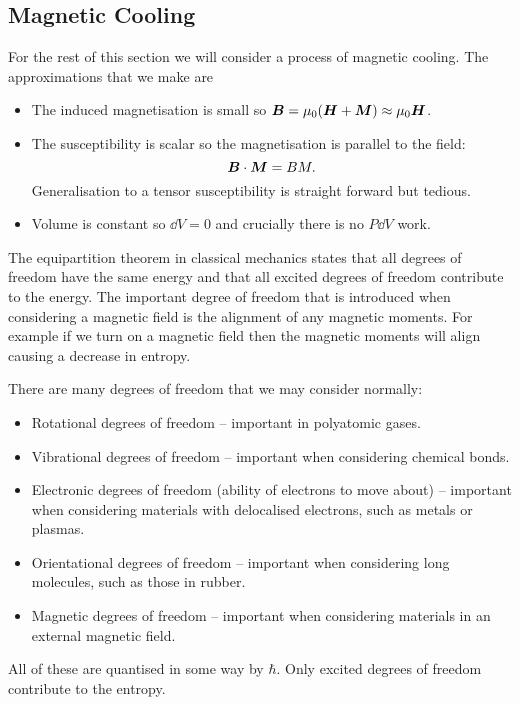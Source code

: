     \subsection{Magnetic Cooling}
    For the rest of this section we will consider a process of magnetic cooling.
    The approximations that we make are
    \begin{itemize}
        \item The induced magnetisation is small so \(\bm{B} = \mu_0(\bm{H} + \bm{M}) \approx \mu_0\bm{H}\).
        \item The susceptibility is scalar so the magnetisation is parallel to the field:
        \[\bm{B}\cdot\bm{M} = BM.\]
        Generalisation to a tensor susceptibility is straight forward but tedious.
        \item Volume is constant so \(\dd{V} = 0\) and crucially there is no \(P\dd{V}\) work.
    \end{itemize}
    The equipartition theorem in classical mechanics states that all degrees of freedom have the same energy and that all excited degrees of freedom contribute to the energy.
    The important degree of freedom that is introduced when considering a magnetic field is the alignment of any magnetic moments.
    For example if we turn on a magnetic field then the magnetic moments will align causing a decrease in entropy.
    
    There are many degrees of freedom that we may consider normally:
    \begin{itemize}
        \item Rotational degrees of freedom -- important in polyatomic gases.
        \item Vibrational degrees of freedom -- important when considering chemical bonds.
        \item Electronic degrees of freedom (ability of electrons to move about) -- important when considering materials with delocalised electrons, such as metals or plasmas.
        \item Orientational degrees of freedom -- important when considering long molecules, such as those in rubber.
        \item Magnetic degrees of freedom -- important when considering materials in an external magnetic field.
    \end{itemize}
    All of these are quantised in some way by \(\hbar\).
    Only excited degrees of freedom contribute to the entropy.
    
